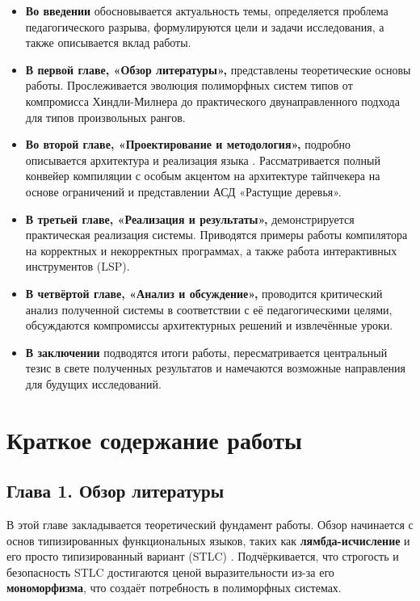 \begin{itemize}
    \item \textbf{Во введении} обосновывается актуальность темы, определяется проблема педагогического разрыва, формулируются цели и задачи исследования, а также описывается вклад работы.
    
    \item \textbf{В первой главе, «Обзор литературы»,} представлены теоретические основы работы. Прослеживается эволюция полиморфных систем типов от компромисса Хиндли-Милнера до практического двунаправленного подхода для типов произвольных рангов.
    
    \item \textbf{Во второй главе, «Проектирование и методология»,} подробно описывается архитектура и реализация языка \Arralac. Рассматривается полный конвейер компиляции с особым акцентом на архитектуре тайпчекера на основе ограничений и представлении АСД «Растущие деревья».
    
    \item \textbf{В третьей главе, «Реализация и результаты»,} демонстрируется практическая реализация системы. Приводятся примеры работы компилятора на корректных и некорректных программах, а также работа интерактивных инструментов (LSP).
    
    \item \textbf{В четвёртой главе, «Анализ и обсуждение»,} проводится критический анализ полученной системы в соответствии с её педагогическими целями, обсуждаются компромиссы архитектурных решений и извлечённые уроки.
    
    \item \textbf{В заключении} подводятся итоги работы, пересматривается центральный тезис в свете полученных результатов и намечаются возможные направления для будущих исследований.
\end{itemize}

\newpage

\section*{Краткое содержание работы}

\subsection*{Глава 1. Обзор литературы}

В этой главе закладывается теоретический фундамент работы. Обзор начинается с основ типизированных функциональных языков, таких как \textbf{лямбда-исчисление} и его просто типизированный вариант (STLC) \cite{Pierce-SF2}. Подчёркивается, что строгость и безопасность STLC достигаются ценой выразительности из-за его \textbf{мономорфизма}, что создаёт потребность в полиморфных системах.

